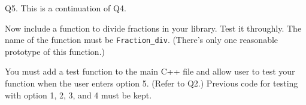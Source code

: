 Q5. This is a continuation of Q4.

Now include a function to divide fractions in your library.
Test it throughly.
The name of the function must be \verb!Fraction_div!.
(There's only one reasonable prototype of this function.)

You must add a test function to the main C++ file and allow user to test
your function when the user enters option 5. (Refer to Q2.)
Previous code for testing with option 1, 2, 3, and 4 must be kept.



